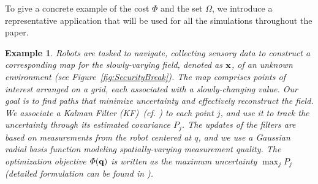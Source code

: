 \documentclass[10pt,twocolumn,twoside]{IEEEtran}
\newtheorem{example}{Example}
\begin{document}
To give a concrete example of the cost $\varPhi$ and the set $\Omega$, we introduce a representative application that will be used for all the simulations throughout the paper.

\begin{example} 
Robots are tasked to navigate, collecting sensory data to construct a corresponding map for the slowly-varying field, denoted as $\mathbf{x}$, of an unknown environment (see Figure~\ref{fig:SecurityBreak}). The map comprises points of interest arranged on a grid, each associated with a slowly-changing value. Our goal is to find paths that minimize uncertainty and effectively reconstruct the field. 
We associate a Kalman Filter (KF)~(cf. \cite{anderson2012optimal}) to each point $j$, and use it to track the uncertainty through its estimated covariance $P_j$. The updates of the filters are based on measurements from the robot centered at $q$, and we use a Gaussian radial basis function  modeling spatially-varying measurement quality. The optimization objective $\varPhi(\mathbf{q})$ is written as the maximum uncertainty $\max_j P_{j}$ (detailed formulation can be found in \cite{yang2020multi}). %
\end{example}
\end{document}
